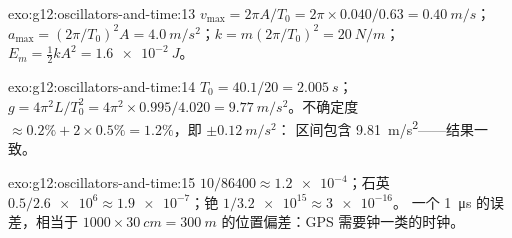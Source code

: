 \begin{solution}{exo:g12:oscillators-and-time:13}
$v_{\max} = 2\pi A/T_0 = 2\pi \times 0.040/0.63 = \qty{0.40}{m/s}$；
$a_{\max} = (2\pi/T_0)^2 A = \qty{4.0}{m/s^2}$；$k = m(2\pi/T_0)^2
= \qty{20}{N/m}$；$E_m = \tfrac12 kA^2 = \qty{1.6e-2}{J}$。
\end{solution}

\begin{solution}{exo:g12:oscillators-and-time:14}
$T_0 = 40.1/20 = \qty{2.005}{s}$；$g = 4\pi^2 L/T_0^2 = 4\pi^2
\times 0.995/4.020 = \qty{9.77}{m/s^2}$。不确定度 $\approx 0.2\%
+ 2 \times 0.5\% = 1.2\%$，即 $\pm\qty{0.12}{m/s^2}$：
区间包含 \qty{9.81}{m/s^2}——结果一致。
\end{solution}

\begin{solution}{exo:g12:oscillators-and-time:15}
 $10/86400 \approx \num{1.2e-4}$；石英 $0.5/\num{2.6e6}
\approx \num{1.9e-7}$；铯 $1/\num{3.2e15} \approx \num{3e-16}$。
一个 \qty{1}{\micro s} 的误差，相当于 $\num{1000} \times \qty{30}{cm} =
\qty{300}{m}$ 的位置偏差：GPS 需要钟一类的时钟。
\end{solution}

